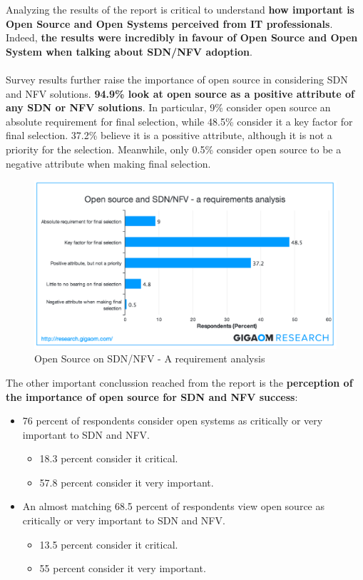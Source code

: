 \documentclass[a4paper, 12pt]{book}
\begin{document}
Analyzing the results of the report is critical to understand \textbf{how important is Open Source and Open Systems perceived from IT professionals}. Indeed, \textbf{the results were incredibly in favour of Open Source and Open System when talking about SDN/NFV adoption}.\\
\\
Survey results further raise the importance of open source in considering SDN and NFV solutions. \textbf{94.9\% look at open source as a positive attribute of any SDN or NFV solutions}. In particular, 9\% consider open source an absolute requirement for final selection, while 48.5\% consider it a key factor for final selection. 37.2\% believe it is a possitive attribute, although it is not a priority for the selection. Meanwhile, only 0.5\% consider open source to be a negative attribute when making final selection.
\begin{center}
 \begin{figure}[H]
 \begin{center}
   \includegraphics[width=15cm]{img/open-source-requirement-operator-view-00.png}
   \caption{Open Source on SDN/NFV - A requirement analysis}
   \label{fig:sdn_hype_cyle}
 \end{center}
 \end{figure}
\end{center}
The other important conclussion reached from the report is the \textbf{perception of the importance of open source for SDN and NFV success}:
\begin{itemize}\itemsep0pt
\item{76 percent of respondents consider open systems as critically or very important to SDN and NFV}.
\begin{itemize}\itemsep0pt
\item{18.3 percent consider it critical.}
\item{57.8 percent consider it very important.}
\end{itemize}
\item{An almost matching 68.5 percent of respondents view open source as critically or very important to SDN and NFV}.
\begin{itemize}\itemsep0pt
\item{13.5 percent consider it critical.}
\item{55 percent consider it very important.}
\end{itemize}
\end{itemize}
\end{document}
